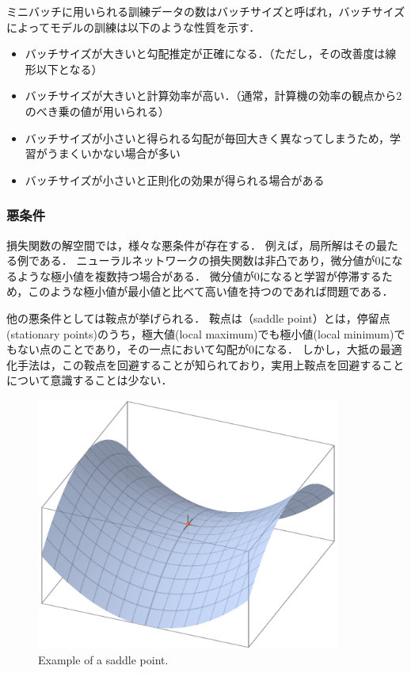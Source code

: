     ミニバッチに用いられる訓練データの数はバッチサイズと呼ばれ，バッチサイズによってモデルの訓練は以下のような性質を示す．
    \begin{itemize}
        \item バッチサイズが大きいと勾配推定が正確になる．（ただし，その改善度は線形以下となる）
        \item バッチサイズが大きいと計算効率が高い．（通常，計算機の効率の観点から2のべき乗の値が用いられる）
        \item バッチサイズが小さいと得られる勾配が毎回大きく異なってしまうため，学習がうまくいかない場合が多い
        \item バッチサイズが小さいと正則化の効果が得られる場合がある\cite{wilson2003general}
    \end{itemize}
    
    \subsubsection{悪条件}
    損失関数の解空間では，様々な悪条件が存在する．
    例えば，局所解はその最たる例である．
    ニューラルネットワークの損失関数は非凸であり，微分値が0になるような極小値を複数持つ場合がある．
    微分値が0になると学習が停滞するため，このような極小値が最小値と比べて高い値を持つのであれば問題である．
    
    他の悪条件としては鞍点が挙げられる．
    鞍点は（saddle point）とは，停留点(stationary points)のうち，極大値(local maximum)でも極小値(local minimum)でもない点のことであり，その一点において勾配が0になる．
    しかし，大抵の最適化手法は，この鞍点を回避することが知られており\cite{goodfellow2014qualitatively}，実用上鞍点を回避することについて意識することは少ない．
    \begin{figure}[ht]
        \begin{center}
            \centering
            \includegraphics[width=10cm]{8_appendix/img/Saddle_point}
            \caption{Example of a saddle point.}
        \end{center}
    \end{figure}
    
